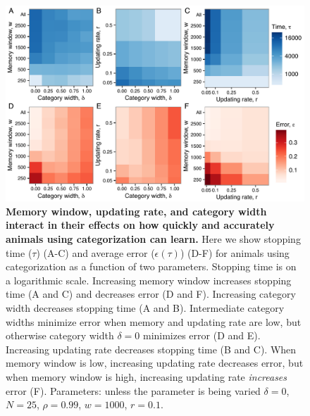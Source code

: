 \begin{figure}[ht]
\includegraphics[width=6.85in]{figures/parameters_interactions_full.pdf}
\caption{\sffamily\small\textbf{Memory window, updating rate, and category width interact in their effects on how quickly and accurately animals using categorization can learn.}
Here we show stopping time ($\tau$) (A-C) and average error ($\epsilon(\tau)$) (D-F) for animals using categorization as a function of two parameters. Stopping time is on a logarithmic scale. Increasing memory window increases stopping time (A and C) and decreases error (D and F). Increasing category width decreases stopping time (A and B). Intermediate category widths minimize error when memory and updating rate are low, but otherwise category width $\delta=0$ minimizes error (D and E). Increasing updating rate decreases stopping time (B and C). When memory window is low, increasing updating rate decreases error, but when memory window is high, increasing updating rate \emph{increases} error (F). Parameters: unless the parameter is being varied $\delta = 0$, $N=25$, $\rho=0.99$, $w=1000$, $r=0.1$. 
}
\label{interactions}
\end{figure}

